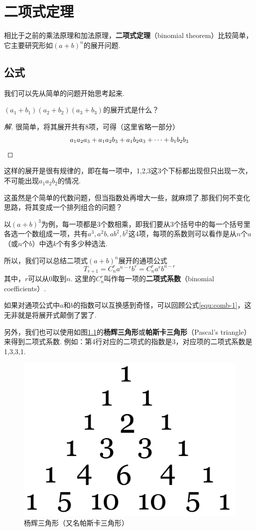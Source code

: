 \chapter{二项式定理}
相比于之前的乘法原理和加法原理，\textbf{二项式定理}（binomial theorem）比较简单，它主要研究形如$(a+b)^n$的展开问题.

\section{公式}
我们可以先从简单的问题开始思考起来.

\begin{lexample}
	$(a_1+b_1)(a_2+b_2)(a_3+b_3)$的展开式是什么？
\end{lexample}

\begin{proof}[解]
	很简单，将其展开共有8项，可得（这里省略一部分）\[a_1a_2a_3+a_1a_2b_3+a_1b_2a_3+\cdots+b_1b_2b_3\qedhere\]
\end{proof}

这样的展开是很有规律的，即在每一项中，1,2,3这3个下标都出现但只出现一次，不可能出现$a_1a_2b_2$的情况.

这虽然是个简单的代数问题，但当指数处再增大一些，就麻烦了.那我们何不变化思路，将其变成一个排列组合的问题？

以$(a+b)^3$为例，每一项都是3个数相乘，即我们要从3个括号中的每一个括号里各选一个数组成一项，共有$a^3,a^2b,ab^2,b^2$这4项，每项的系数则可以看作是从$n$个$a$（或$n$个$b$）中选$k$个有多少种选法.

所以，我们可以总结二项式$(a+b)^n$展开的通项公式\[T_{r+1}=C_n^ra^{n-r}b^r=C_n^ra^rb^{n-r}\]其中，$r$可以从0取到$n$. 这里的$C_n^r$叫作每一项的\textbf{二项式系数}（binomial coefficients）.

如果对通项公式中$a$和$b$的指数可以互换感到奇怪，可以回顾公式\eqref{equ:comb-1}，这无非就是将展开式颠倒了罢了.

另外，我们也可以使用如图\ref{fig:pascals-triangle}的\textbf{杨辉三角形}或\textbf{帕斯卡三角形}（Pascal's triangle）来得到二项式系数. 例如：第4行对应的二项式的指数是3，对应项的二项式系数是1,3,3,1.

\begin{figure}[htb]
	\centering
	\includegraphics[width=0.4\linewidth]{src/images/pascals-triangle.png}
	\caption{杨辉三角形（又名帕斯卡三角形）}
	\label{fig:pascals-triangle}
\end{figure}

